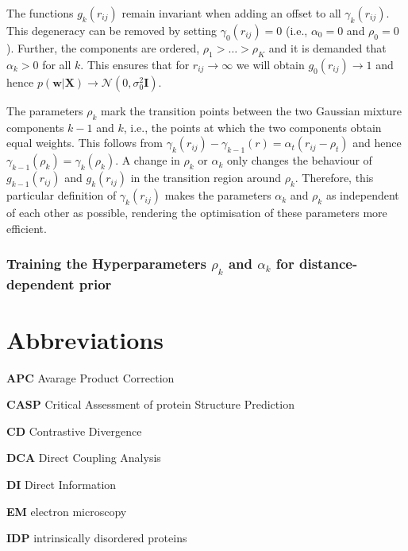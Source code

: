 \documentclass[12pt,a4paper,twoside]{book}
\newcommand{\Gauss}{\mathcal{N}}
\newcommand{\I}{\mathbf{I}}
\newcommand{\rij}{r_{ij}}
\newcommand{\w}{\mathbf{w}}
\newcommand{\X}{\mathbf{X}}
\theoremstyle{definition}
\theoremstyle{definition}
\theoremstyle{remark}
\begin{document}
The functions \(g_k(\rij)\) remain invariant when adding an offset to
all \(\gamma_k(\rij)\). This degeneracy can be removed by setting
\(\gamma_0(\rij) = 0\) (i.e., \(\alpha_0 = 0\) and \(\rho_0=0\)).
Further, the components are ordered, \(\rho_1> \ldots > \rho_K\) and it
is demanded that \(\alpha_k > 0\) for all \(k\). This ensures that for
\(\rij \rightarrow \infty\) we will obtain \(g_0(\rij) \rightarrow 1\)
and hence \(p(\w | \X) \rightarrow \Gauss(0, \sigma_0^2 \I )\).

The parameters \(\rho_k\) mark the transition points between the two
Gaussian mixture components \(k-1\) and \(k\), i.e., the points at which
the two components obtain equal weights. This follows from
\(\gamma_k(\rij) - \gamma_{k-1}(r) = \alpha_{t} ( \rij - \rho_{t})\) and
hence \(\gamma_{k-1}(\rho_k) = \gamma_k(\rho_k)\). A change in
\(\rho_k\) or \(\alpha_k\) only changes the behaviour of
\(g_{k-1}(\rij)\) and \(g_k(\rij)\) in the transition region around
\(\rho_k\). Therefore, this particular definition of \(\gamma_k(\rij)\)
makes the parameters \(\alpha_k\) and \(\rho_k\) as independent of each
other as possible, rendering the optimisation of these parameters more
efficient.

\subsection{\texorpdfstring{Training the Hyperparameters \(\rho_k\) and
\(\alpha_k\) for distance-dependent
prior}{Training the Hyperparameters \textbackslash{}rho\_k and \textbackslash{}alpha\_k for distance-dependent prior}}\label{training-the-hyperparameters-rho_k-and-alpha_k-for-distance-dependent-prior}

\appendix


\hypertarget{abbrev}{\chapter{Abbreviations}\label{abbrev}}

\textbf{APC} Avarage Product Correction

\textbf{CASP} Critical Assessment of protein Structure Prediction

\textbf{CD} Contrastive Divergence

\textbf{DCA} Direct Coupling Analysis

\textbf{DI} Direct Information

\textbf{EM} electron microscopy

\textbf{IDP} intrinsically disordered proteins
\end{document}
